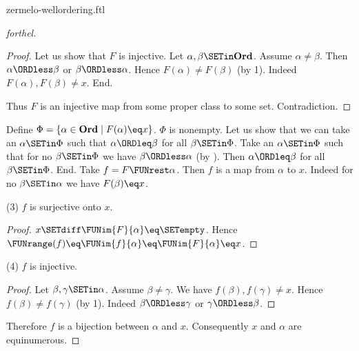 \documentclass{article}
\newcommand\Ord{\textbf{Ord}}
\begin{document}
\begin{smodule}{zermelo-wellordering.ftl}
\begin{proof}[forthel]
\begin{proof}
    Let us show that $F$ is injective.
      Let $\alpha, \beta \SETin \Ord$.
      Assume $\alpha \neq \beta$.
      Then $\alpha \ORDless \beta$ or $\beta \ORDless \alpha$.
      Hence $F(\alpha) \neq F(\beta)$ (by 1).
      Indeed $F(\alpha), F(\beta) \neq x$.
    End.

    Thus $F$ is an injective map from some proper class to some set.
    Contradiction.
  \end{proof}

  Define $\Phi = \{ \alpha \in \Ord \mid F(\alpha) \eq x \}$.
  $\Phi$ is nonempty.
  Let us show that we can take an $\alpha \SETin \Phi$ such that $\alpha \ORDleq \beta$ for all $\beta \SETin \Phi$.
    Take an $\alpha \SETin \Phi$ such that for no $\beta \SETin \Phi$ we have $\beta \ORDless \alpha$ (by ).
    Then $\alpha \ORDleq \beta$ for all $\beta \SETin \Phi$.
  End.
  Take $f = F \FUNrest \alpha$.
  Then $f$ is a map from $\alpha$ to $x$.
  Indeed for no $\beta \SETin \alpha$ we have $F(\beta) \eq x$.

  (3) $f$ is surjective onto $x$.
  \begin{proof}
    $x \SETdiff \FUNim{F}{\alpha} \eq \SETempty$.
    Hence $\FUNrange(f)
      \eq \FUNim{f}{\alpha}
      \eq \FUNim{F}{\alpha}
      \eq x$.
  \end{proof}

  (4) $f$ is injective.
  \begin{proof}
    Let $\beta, \gamma \SETin \alpha$.
    Assume $\beta \neq \gamma$.
    We have $f(\beta), f(\gamma) \neq x$.
    Hence $f(\beta) \neq f(\gamma)$ (by 1).
    Indeed $\beta \ORDless \gamma$ or $\gamma \ORDless \beta$.
  \end{proof}

  Therefore $f$ is a bijection between $\alpha$ and $x$.
  Consequently $x$ and $\alpha$ are equinumerous.
\end{proof}

\printbibliography
{}
\end{smodule}
\end{document}
